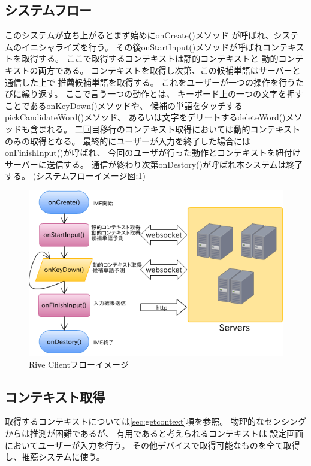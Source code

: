 \subsection{システムフロー}
このシステムが立ち上がるとまず始めにonCreate()メソッド
が呼ばれ、システムのイニシャライズを行う。
その後onStartInput()メソッドが呼ばれコンテキストを取得する。
ここで取得するコンテキストは静的コンテキストと
動的コンテキストの両方である。
コンテキストを取得し次第、この候補単語はサーバーと通信した上で
推薦候補単語を取得する。
これをユーザーが一つの操作を行うたびに繰り返す。
ここで言う一つの動作とは、
キーボード上の一つの文字を押すことであるonKeyDown()メソッドや、
候補の単語をタッチするpickCandidateWord()メソッド、
あるいは文字をデリートするdeleteWord()メソッドも含まれる。
二回目移行のコンテキスト取得においては動的コンテキストのみの取得となる。
最終的にユーザーが入力を終了した場合にはonFinishInput()が呼ばれ、
今回のユーザが行った動作とコンテキストを紐付けサーバーに送信する。
通信が終わり次第onDestory()が呼ばれ本システムは終了する。
(システムフローイメージ図:\ref{fig:clientflow})
\begin{figure}[htbp]
  \begin{center}
    \includegraphics[width=140mm,bb=0 0 562 366]{images/clientflow}
  \end{center}
  \caption{Rive Clientフローイメージ}
  \label{fig:clientflow}
\end{figure}

\subsection{コンテキスト取得}
取得するコンテキストについては\ref{sec:getcontext}項を参照。
物理的なセンシングからは推測が困難であるが、
有用であると考えられるコンテキストは
設定画面においてユーザーが入力を行う。
その他デバイスで取得可能なものを全て取得し、推薦システムに使う。

